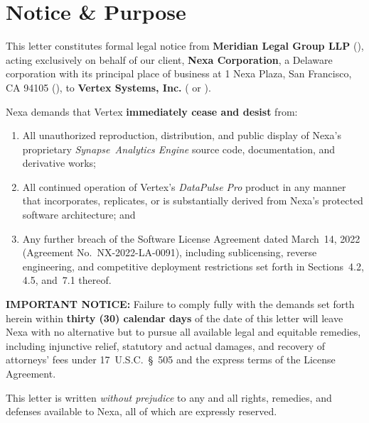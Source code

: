 
\section{Notice \& Purpose}

\noindent
This letter constitutes formal legal notice from \textbf{Meridian Legal Group LLP}
(), acting exclusively on behalf of our client,
\textbf{Nexa Corporation}, a Delaware corporation with its principal place of
business at 1 Nexa Plaza, San Francisco, CA 94105 (), to
\textbf{Vertex Systems, Inc.} ( or ).

Nexa demands that Vertex \textbf{immediately cease and desist} from:

\begin{enumerate}[leftmargin=2em, itemsep=6pt]
  \item[\textcolor{NexaGold}{\faCircle[regular]}\;]
    All unauthorized reproduction, distribution, and public display of Nexa's
    proprietary \textit{Synapse\texttrademark\ Analytics Engine} source code,
    documentation, and derivative works;

  \item[\textcolor{NexaGold}{\faCircle[regular]}\;]
    All continued operation of Vertex's \textit{DataPulse Pro} product in any
    manner that incorporates, replicates, or is substantially derived from
    Nexa's protected software architecture; and

  \item[\textcolor{NexaGold}{\faCircle[regular]}\;]
    Any further breach of the Software License Agreement dated March~14, 2022
    (Agreement No.~NX-2022-LA-0091), including sublicensing, reverse engineering,
    and competitive deployment restrictions set forth in Sections~4.2, 4.5,
    and~7.1 thereof.
\end{enumerate}

\begin{warningbox}
  \textcolor{NexaRed}{\faExclamationTriangle\;\bfseries IMPORTANT NOTICE:}
  Failure to comply fully with the demands set forth herein within
  \textbf{thirty (30) calendar days} of the date of this letter will leave
  Nexa with no alternative but to pursue all available legal and equitable
  remedies, including injunctive relief, statutory and actual damages, and
  recovery of attorneys' fees under 17~U.S.C.~\S~505 and the express terms
  of the License Agreement.
\end{warningbox}

\vspace{6pt}

\noindent
This letter is written \textit{without prejudice} to any and all rights, remedies,
and defenses available to Nexa, all of which are expressly reserved.

